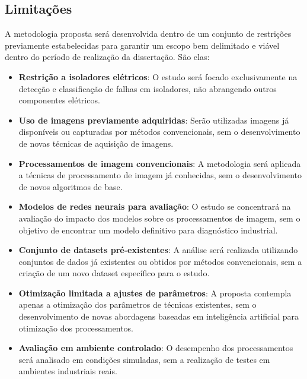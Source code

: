 \documentclass[12pt]{article}
\begin{document}
\subsection{Limitações}

A metodologia proposta será desenvolvida dentro de um conjunto de restrições previamente estabelecidas para garantir um escopo bem delimitado e viável dentro do período de realização da dissertação. São elas:

\begin{itemize}
    \item \textbf{Restrição a isoladores elétricos}: O estudo será focado exclusivamente na detecção e classificação de falhas em isoladores, não abrangendo outros componentes elétricos.
    \item \textbf{Uso de imagens previamente adquiridas}: Serão utilizadas imagens já disponíveis ou capturadas por métodos convencionais, sem o desenvolvimento de novas técnicas de aquisição de imagens.
    \item \textbf{Processamentos de imagem convencionais}: A metodologia será aplicada a técnicas de processamento de imagem já conhecidas, sem o desenvolvimento de novos algoritmos de base.
    \item \textbf{Modelos de redes neurais para avaliação}: O estudo se concentrará na avaliação do impacto dos modelos sobre os processamentos de imagem, sem o objetivo de encontrar um modelo definitivo para diagnóstico industrial.
    \item \textbf{Conjunto de datasets pré-existentes}: A análise será realizada utilizando conjuntos de dados já existentes ou obtidos por métodos convencionais, sem a criação de um novo dataset específico para o estudo.
    \item \textbf{Otimização limitada a ajustes de parâmetros}: A proposta contempla apenas a otimização dos parâmetros de técnicas existentes, sem o desenvolvimento de novas abordagens baseadas em inteligência artificial para otimização dos processamentos.
    \item \textbf{Avaliação em ambiente controlado}: O desempenho dos processamentos será analisado em condições simuladas, sem a realização de testes em ambientes industriais reais.
\end{itemize}
\end{document}
